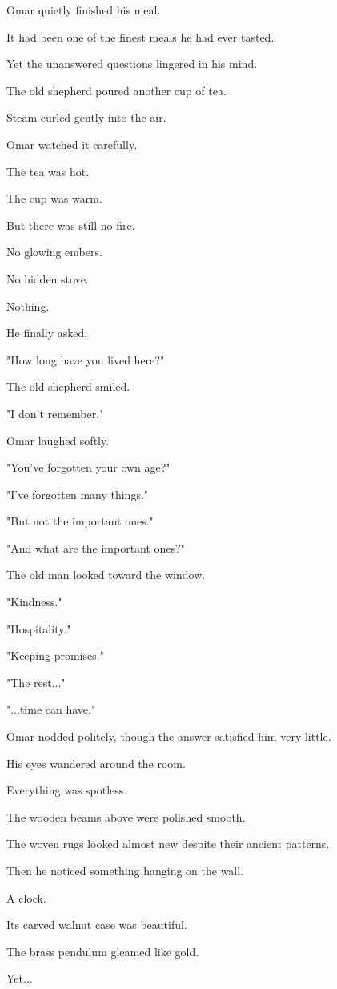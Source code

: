 \documentclass[12pt,openany]{book}
\begin{document}
Omar quietly finished his meal.

It had been one of the finest meals he had ever tasted.

Yet the unanswered questions lingered in his mind.

The old shepherd poured another cup of tea.

Steam curled gently into the air.

Omar watched it carefully.

The tea was hot.

The cup was warm.

But there was still no fire.

No glowing embers.

No hidden stove.

Nothing.

He finally asked,

"How long have you lived here?"

The old shepherd smiled.

"I don't remember."

Omar laughed softly.

"You've forgotten your own age?"

"I've forgotten many things."

"But not the important ones."

"And what are the important ones?"

The old man looked toward the window.

"Kindness."

"Hospitality."

"Keeping promises."

"The rest..."

"...time can have."

Omar nodded politely, though the answer satisfied him very little.

His eyes wandered around the room.

Everything was spotless.

The wooden beams above were polished smooth.

The woven rugs looked almost new despite their ancient patterns.

Then he noticed something hanging on the wall.

A clock.

Its carved walnut case was beautiful.

The brass pendulum gleamed like gold.

Yet...
\end{document}

